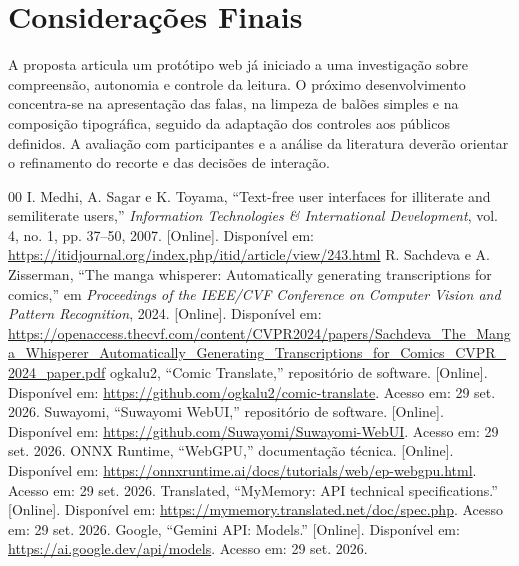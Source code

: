 \documentclass[conference]{IEEEtran}
\begin{document}
\section{Considerações Finais}
A proposta articula um protótipo web já iniciado a uma investigação sobre compreensão, autonomia e controle da leitura. O próximo desenvolvimento concentra-se na apresentação das falas, na limpeza de balões simples e na composição tipográfica, seguido da adaptação dos controles aos públicos definidos. A avaliação com participantes e a análise da literatura deverão orientar o refinamento do recorte e das decisões de interação.

\begin{thebibliography}{00}
 I. Medhi, A. Sagar e K. Toyama, ``Text-free user interfaces for illiterate and semiliterate users,'' \emph{Information Technologies \& International Development}, vol. 4, no. 1, pp. 37--50, 2007. [Online]. Disponível em: \url{https://itidjournal.org/index.php/itid/article/view/243.html}
 R. Sachdeva e A. Zisserman, ``The manga whisperer: Automatically generating transcriptions for comics,'' em \emph{Proceedings of the IEEE/CVF Conference on Computer Vision and Pattern Recognition}, 2024. [Online]. Disponível em: \url{https://openaccess.thecvf.com/content/CVPR2024/papers/Sachdeva_The_Manga_Whisperer_Automatically_Generating_Transcriptions_for_Comics_CVPR_2024_paper.pdf}
 ogkalu2, ``Comic Translate,'' repositório de software. [Online]. Disponível em: \url{https://github.com/ogkalu2/comic-translate}. Acesso em: 29 set. 2026.
 Suwayomi, ``Suwayomi WebUI,'' repositório de software. [Online]. Disponível em: \url{https://github.com/Suwayomi/Suwayomi-WebUI}. Acesso em: 29 set. 2026.
 ONNX Runtime, ``WebGPU,'' documentação técnica. [Online]. Disponível em: \url{https://onnxruntime.ai/docs/tutorials/web/ep-webgpu.html}. Acesso em: 29 set. 2026.
 Translated, ``MyMemory: API technical specifications.'' [Online]. Disponível em: \url{https://mymemory.translated.net/doc/spec.php}. Acesso em: 29 set. 2026.
 Google, ``Gemini API: Models.'' [Online]. Disponível em: \url{https://ai.google.dev/api/models}. Acesso em: 29 set. 2026.
\end{thebibliography}
\end{document}
